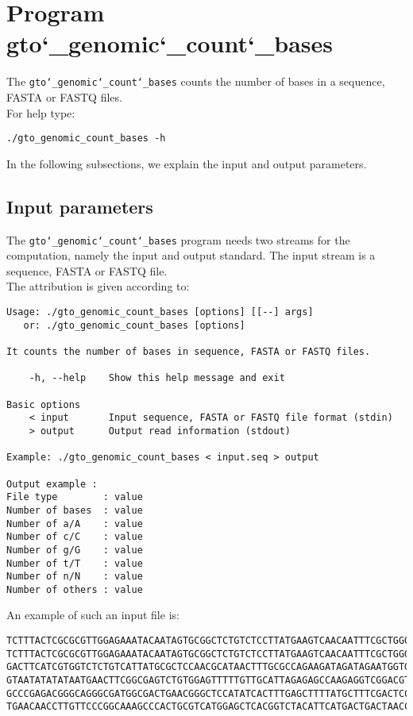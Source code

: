 \section{Program gto\char`_genomic\char`_count\char`_bases}
The \texttt{gto\char`_genomic\char`_count\char`_bases} counts the number of bases in a sequence, FASTA or FASTQ files.\\
For help type:
\begin{lstlisting}
./gto_genomic_count_bases -h
\end{lstlisting}
In the following subsections, we explain the input and output parameters.

\subsection*{Input parameters}

The \texttt{gto\char`_genomic\char`_count\char`_bases} program needs two streams for the computation, namely the input and output standard. The input stream is a sequence, FASTA or FASTQ file.\\
The attribution is given according to:
\begin{lstlisting}
Usage: ./gto_genomic_count_bases [options] [[--] args]
   or: ./gto_genomic_count_bases [options]

It counts the number of bases in sequence, FASTA or FASTQ files.

    -h, --help    Show this help message and exit

Basic options
    < input       Input sequence, FASTA or FASTQ file format (stdin)
    > output      Output read information (stdout)

Example: ./gto_genomic_count_bases < input.seq > output

Output example :
File type        : value
Number of bases  : value
Number of a/A    : value
Number of c/C    : value
Number of g/G    : value
Number of t/T    : value
Number of n/N    : value
Number of others : value
\end{lstlisting}
An example of such an input file is:
\begin{lstlisting}
TCTTTACTCGCGCGTTGGAGAAATACAATAGTGCGGCTCTGTCTCCTTATGAAGTCAACAATTTCGCTGGGACTTGCGGC
TCTTTACTCGCGCGTTGGAGAAATACAATAGTGCGGCTCTGTCTCCTTATGAAGTCAACAATTTCGCTGGGACTTGCGGC
GACTTCATCGTGGTCTCTGTCATTATGCGCTCCAACGCATAACTTTGCGCCAGAAGATAGATAGAATGGTGTAAGAAACT
GTAATATATATAATGAACTTCGGCGAGTCTGTGGAGTTTTTGTTGCATTAGAGAGCCAAGAGGTCGGACGTCCTCACGTA
GCCCGAGACGGGCAGGGCGATGGCGACTGAACGGGCTCCATATCACTTTGAGCTTTTATGCTTTCGACTCCTCCAGGAGC
TGAACAACCTTGTTCCCGGCAAAGCCCACTGCGTCATGGAGCTCACGGTCTACATTCATGACTGACTAACCGTAAACTGC
\end{lstlisting}

